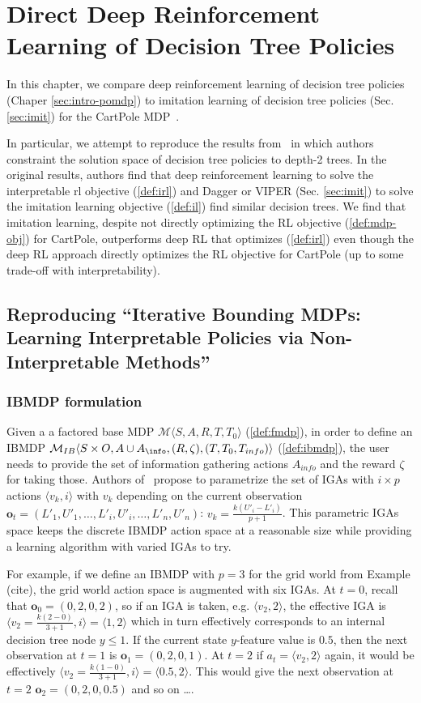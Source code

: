 \chapter{Direct Deep Reinforcement Learning of Decision Tree Policies}\label{sec:topin}
In this chapter, we compare deep reinforcement learning of decision tree policies (Chaper \ref{sec:intro-pomdp}) to imitation learning of decision tree policies (Sec. \ref{sec:imit}) for the CartPole MDP~\cite{cartpole}.

In particular, we attempt to reproduce the results from~\cite[Table 1]{topin2021iterative} in which authors constraint the solution space of decision tree policies to depth-2 trees.
In the original results, authors find that deep reinforcement learning to solve the interpretable rl objective (\ref{def:irl}) and Dagger or VIPER (Sec. \ref{sec:imit}) to solve the imitation learning objective (\ref{def:il}) find similar decision trees.
We find that imitation learning, despite not directly optimizing the RL objective (\ref{def:mdp-obj}) for CartPole, outperforms deep RL that optimizes (\ref{def:irl}) even though the deep RL approach directly optimizes the RL objective for CartPole (up to some trade-off with interpretability).
\section{Reproducing ``Iterative Bounding MDPs: Learning Interpretable Policies via Non-Interpretable Methods''}

\subsection{IBMDP formulation}
Given a a factored base MDP $\mathcal{M}\langle S, A, R, T, T_0\rangle$ (\ref{def:fmdp}), in order to define an IBMDP $\mathcal{M}_{IB}\langle S\times O, A\cup A_{\info}, (R, \zeta),( T, T_0, T_{info})\rangle$ (\ref{def:ibmdp}), the user needs to provide the set of information gathering actions $A_{info}$ and the reward $\zeta$ for taking those.
Authors of~\cite{topin2021iterative} propose to parametrize the set of IGAs with $i \times p$ actions $\langle v_k, i \rangle$ with $v_k$ depending on the current observation $\boldsymbol{o}_t=(L'_1, U'_1, \dots, L'_i, U'_i, \dots, L'_n, U'_n)$: $v_k = \frac{k(U'_i - L'_i)}{p+1}$.
This parametric IGAs space keeps the discrete IBMDP action space at a reasonable size while providing a learning algorithm with varied IGAs to try.

For example, if we define an IBMDP with $p=3$ for the grid world from Example (cite), the grid world action space is augmented with six IGAs. 
At $t=0$, recall that $\boldsymbol{o}_0=(0, 2, 0, 2)$, so if an IGA is taken, e.g. $\langle v_2, 2 \rangle$, the effective IGA is $\langle v_2=\frac{k(2-0)}{3+1}, i \rangle = \langle 1, 2 \rangle$ which in turn effectively corresponds to an internal decision tree node $y \leq 1$.
If the current state $y$-feature value is $0.5$, then the next observation at $t=1$ is $\boldsymbol{o}_1=(0, 2, 0, 1)$. At $t=2$ if $a_t=\langle v_2, 2 \rangle$ again, it would be effectively $\langle v_2=\frac{k(1-0)}{3+1}, i \rangle = \langle 0.5, 2 \rangle$. 
This would give the next observation at $t=2$ $\boldsymbol{o}_2=(0, 2, 0, 0.5)$ and so on \dots. 

